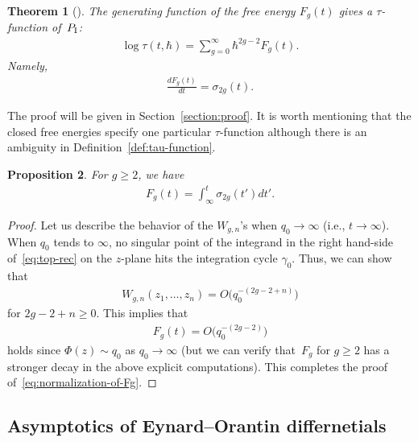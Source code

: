 \documentclass[pdftex]{sigma}
\newtheorem{thm}{Theorem}[section]
\newtheorem{prop}[thm]{Proposition}
\theoremstyle{definition}
\numberwithin{equation}{section}
\def\PI{P_{\rm I}}
\begin{document}
\begin{thm} [] \label{conj:1}
The generating function of the free energy $F_{g}(t)$
gives a $\tau$-function of~$\PI$:
\begin{gather*}
\log\tau(t,\hbar) = \sum_{g=0}^{\infty} \hbar^{2g-2} F_{g}(t).
\end{gather*}
Namely,
\begin{gather} \label{eq:tau-conjecture-g}
\frac{dF_{g}(t)}{dt} = \sigma_{2g}(t).
\end{gather}
\end{thm}

The proof will be given in Section~\ref{section:proof}.
It is worth mentioning that the closed free energies specify one
particular $\tau$-function although there is an ambiguity
in Def\/inition~\ref{def:tau-function}.

\begin{prop}
For $g \ge 2$, we have
\begin{gather} \label{eq:normalization-of-Fg}
F_{g}(t) = \int^{t}_{\infty} \sigma_{2g}(t')dt'.
\end{gather}
\end{prop}

\begin{proof}
Let us describe the behavior of the  $W_{g,n}$'s when
$q_{0} \rightarrow \infty$ (i.e., $t \rightarrow \infty$).
When $q_{0}$ tends to $\infty$,
no singular point of the integrand in the right hand-side of~\eqref{eq:top-rec}
on the $z$-plane hits the integration cycle $\gamma_{0}$.
Thus, we can show that
\begin{gather*}
W_{g,n}(z_{1},\dots,z_{n}) = O\big(q_{0}^{-(2g-2+n)}\big)
\end{gather*}
for $2g-2+n \ge 0$. This implies that
\begin{gather*}
F_{g}(t) = O\big(q_{0}^{-(2g-2)}\big)
\end{gather*}
holds since $\Phi(z) \sim q_{0}$ as $q_{0} \rightarrow \infty$
(but we can verify that~$F_{g}$ for $g \ge 2$
has a stronger decay in the above explicit computations).
This completes the proof of~\eqref{eq:normalization-of-Fg}.
\end{proof}


\subsection{Asymptotics of Eynard--Orantin dif\/fernetials}
\label{section:asymptotics-Wgn}
\end{document}
